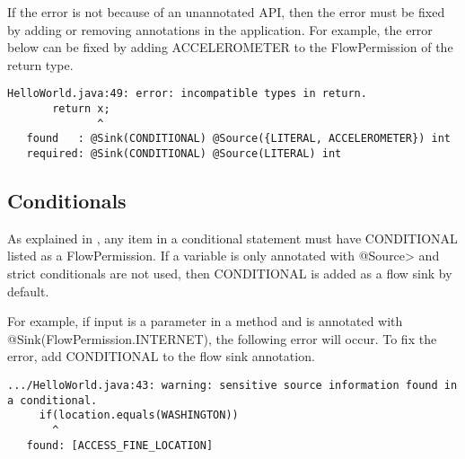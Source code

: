 If the error is not because of an unannotated API, then the error must be fixed by adding or
removing annotations in the application.  For example, the error below can be fixed by adding ACCELEROMETER to the FlowPermission of the return type.  

\begin{Verbatim}
HelloWorld.java:49: error: incompatible types in return.
       return x;
              ^
   found   : @Sink(CONDITIONAL) @Source({LITERAL, ACCELEROMETER}) int
   required: @Sink(CONDITIONAL) @Source(LITERAL) int
\end{Verbatim}

\subsection{Conditionals}
As explained in , any item in a conditional statement must have CONDITIONAL listed as a FlowPermission.  If a variable is only annotated with \<@Source> and strict conditionals are not used, then CONDITIONAL is added as a flow sink by default. 

For example, if input is a parameter in a method and is annotated with @Sink(FlowPermission.INTERNET), the following error will occur.  To fix the error, add CONDITIONAL to the flow sink annotation.  

\begin{Verbatim}
.../HelloWorld.java:43: warning: sensitive source information found in a conditional.
     if(location.equals(WASHINGTON))
       ^
   found: [ACCESS_FINE_LOCATION]
\end{Verbatim}




